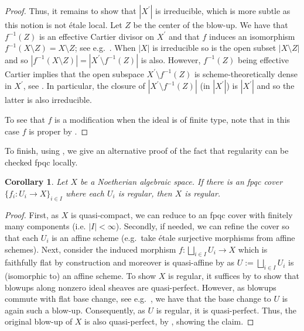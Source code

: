 \documentclass[11pt]{amsart}
\theoremstyle{plain}
\newtheorem{corollary}[theorem]{Corollary}
\theoremstyle{definition}
\numberwithin{equation}{section}
\numberwithin{theorem}{section}
\begin{document}
\begin{appendix}
\begin{proof}
    Thus, it remains to show that $|X^\prime|$ is irreducible, which is more subtle as this notion is not \'{e}tale local. 
    Let $Z$ be the center of the blow-up. We have that $f^{-1}(Z)$ is an effective Cartier divisor on $X^\prime$ and that $f$ induces an isomorphism $f^{-1}(X\setminus Z)= X\setminus Z$; see e.g.\ \cite[\href{https://stacks.math.columbia.edu/tag/085T}{Tag 085T}]{StacksProject}. 
    When $|X|$ is irreducible so is the open subset $|X\setminus Z|$ and so $|f^{-1}(X\setminus Z)| = |X^\prime \setminus f^{-1}(Z)|$ is also.
    However, $f^{-1}(Z)$ being effective Cartier implies that the open subspace $X^\prime \setminus f^{-1}(Z)$ is scheme-theoretically dense in $X^\prime$, see \cite[\href{https://stacks.math.columbia.edu/tag/083S}{Tag 083S}]{StacksProject}. 
    In particular, the closure of $|X^\prime \setminus f^{-1}(Z)|$ (in $|X^\prime|$) is $|X^\prime|$ and so the latter is also irreducible. 

    To see that $f$ is a modification when the ideal is of finite type, note that in this case $f$ is proper by \cite[\href{https://stacks.math.columbia.edu/tag/085Z}{Tag 085Z}]{StacksProject}.
\end{proof}

To finish, using , we give an alternative proof of the fact that regularity can be checked fpqc locally. 

\begin{corollary}
    \label{cor:fpqc_and_regularity}
    Let $X$ be a Noetherian algebraic space. If there is an fpqc cover $\{f_i\colon U_i \to X\}_{i\in I}$ where each $U_i$ is regular, then $X$ is regular.
\end{corollary}

\begin{proof}
    First, as $X$ is quasi-compact, we can reduce to an fpqc cover with finitely many components (i.e. $|I|<\infty$). 
    Secondly, if needed, we can refine the cover so that each $U_i$ is an affine scheme (e.g.\ take \'{e}tale surjective morphisms from affine schemes). 
    Next, consider the induced morphism $f\colon \bigsqcup_{i\in I} U_i \to X$ which is faithfully flat by construction and moreover is quasi-affine by  as $U:=\bigsqcup_{i\in I} U_i$ is (isomorphic to) an affine scheme. 
    To show $X$ is regular, it suffices by  to show that blowups along nonzero ideal sheaves are quasi-perfect.
    However, as blowups commute with flat base change, see e.g.\ \cite[\href{https://stacks.math.columbia.edu/tag/0805}{Tag 0805}]{StacksProject}, we have that the base change to $U$ is again such a blow-up. 
    Consequently, as $U$ is regular, it is quasi-perfect. 
    Thus, the original blow-up of $X$ is also quasi-perfect, by , showing the claim.
\end{proof}


\end{appendix}
\end{document}
